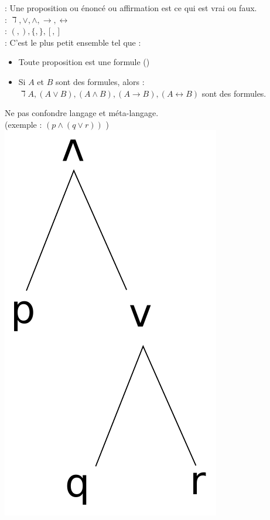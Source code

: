  : Une proposition ou énoncé ou affirmation est ce qui est vrai ou faux. \\

 : $\daleth, \vee, \wedge, \rightarrow, \leftrightarrow$\\

 : $(,),\{,\},[,]$\\

: C'est le plus petit ensemble tel que : 
\begin{itemize}
	\item Toute proposition est une formule ()
	\item Si $A$ et $B$ sont des formules, alors : \\$\daleth A, (A\vee B), (A\wedge B), (A \rightarrow B), (A\leftrightarrow B)$ sont des formules.
\end{itemize}

 Ne pas confondre langage et méta-langage. \\

 (exemple : $(p\wedge (q\vee r))$ )\\
\includegraphics[width=0.15\linewidth]{fig2_arbo.pdf}
